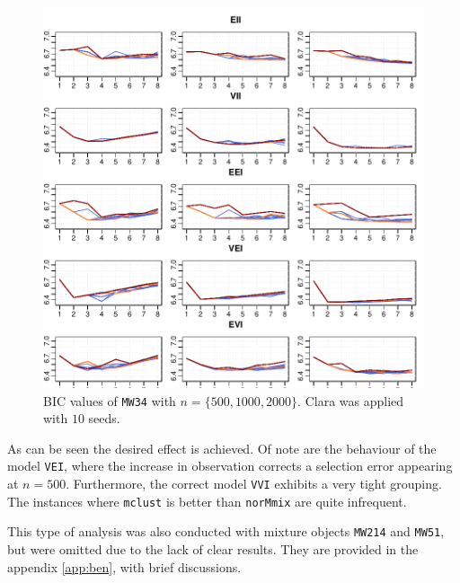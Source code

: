 \begin{figure}[h!]
    \begin{Rgraph}[0.9]
\includegraphics{chapter3-figmw34bicfirst}
    \caption{BIC values of {\tt MW34} with $n=\{500, 1000, 2000\}$. Clara was 
             applied with $10$ seeds.}
    \label{fig:bicmw34first}
    \end{Rgraph}
\end{figure}

As can be seen the desired effect is achieved. Of note are the behaviour of 
the model {\tt VEI}, where the increase in observation corrects a selection
error appearing at $n=500$. Furthermore, the correct model {\tt VVI} exhibits
a very tight grouping. The instances where {\tt mclust} is better than 
{\tt norMmix} are quite infrequent.

This type of analysis was also conducted with mixture objects {\tt MW214} and 
{\tt MW51}, but were omitted due to the lack of clear results. They are 
provided in the appendix \ref{app:ben}, with brief discussions.


